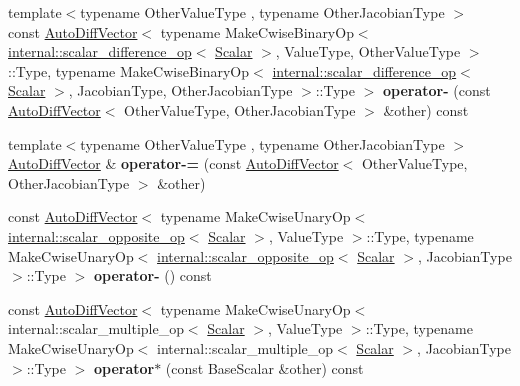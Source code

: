 \begin{DoxyCompactItemize}
{\footnotesize template$<$typename Other\+Value\+Type , typename Other\+Jacobian\+Type $>$ }\\const \hyperlink{class_eigen_1_1_auto_diff_vector}{Auto\+Diff\+Vector}$<$ typename Make\+Cwise\+Binary\+Op$<$ \hyperlink{struct_eigen_1_1internal_1_1scalar__difference__op}{internal\+::scalar\+\_\+difference\+\_\+op}$<$ \hyperlink{class_eigen_1_1_auto_diff_scalar}{Scalar} $>$, Value\+Type, Other\+Value\+Type $>$\+::Type, typename Make\+Cwise\+Binary\+Op$<$ \hyperlink{struct_eigen_1_1internal_1_1scalar__difference__op}{internal\+::scalar\+\_\+difference\+\_\+op}$<$ \hyperlink{class_eigen_1_1_auto_diff_scalar}{Scalar} $>$, Jacobian\+Type, Other\+Jacobian\+Type $>$\+::Type $>$ {\bfseries operator-\/} (const \hyperlink{class_eigen_1_1_auto_diff_vector}{Auto\+Diff\+Vector}$<$ Other\+Value\+Type, Other\+Jacobian\+Type $>$ \&other) const
\item 
\mbox{\label{class_eigen_1_1_auto_diff_vector_a8643a9d4537d9ea19edd4fb8911b532a}} 
{\footnotesize template$<$typename Other\+Value\+Type , typename Other\+Jacobian\+Type $>$ }\\\hyperlink{class_eigen_1_1_auto_diff_vector}{Auto\+Diff\+Vector} \& {\bfseries operator-\/=} (const \hyperlink{class_eigen_1_1_auto_diff_vector}{Auto\+Diff\+Vector}$<$ Other\+Value\+Type, Other\+Jacobian\+Type $>$ \&other)
\item 
\mbox{\label{class_eigen_1_1_auto_diff_vector_a5b60e5830761efb351d6dd410c824b4e}} 
const \hyperlink{class_eigen_1_1_auto_diff_vector}{Auto\+Diff\+Vector}$<$ typename Make\+Cwise\+Unary\+Op$<$ \hyperlink{struct_eigen_1_1internal_1_1scalar__opposite__op}{internal\+::scalar\+\_\+opposite\+\_\+op}$<$ \hyperlink{class_eigen_1_1_auto_diff_scalar}{Scalar} $>$, Value\+Type $>$\+::Type, typename Make\+Cwise\+Unary\+Op$<$ \hyperlink{struct_eigen_1_1internal_1_1scalar__opposite__op}{internal\+::scalar\+\_\+opposite\+\_\+op}$<$ \hyperlink{class_eigen_1_1_auto_diff_scalar}{Scalar} $>$, Jacobian\+Type $>$\+::Type $>$ {\bfseries operator-\/} () const
\item 
\mbox{\label{class_eigen_1_1_auto_diff_vector_a05674ef2fa708ff752109d194c53d60e}} 
const \hyperlink{class_eigen_1_1_auto_diff_vector}{Auto\+Diff\+Vector}$<$ typename Make\+Cwise\+Unary\+Op$<$ internal\+::scalar\+\_\+multiple\+\_\+op$<$ \hyperlink{class_eigen_1_1_auto_diff_scalar}{Scalar} $>$, Value\+Type $>$\+::Type, typename Make\+Cwise\+Unary\+Op$<$ internal\+::scalar\+\_\+multiple\+\_\+op$<$ \hyperlink{class_eigen_1_1_auto_diff_scalar}{Scalar} $>$, Jacobian\+Type $>$\+::Type $>$ {\bfseries operator$\ast$} (const Base\+Scalar \&other) const

\end{DoxyCompactItemize}

